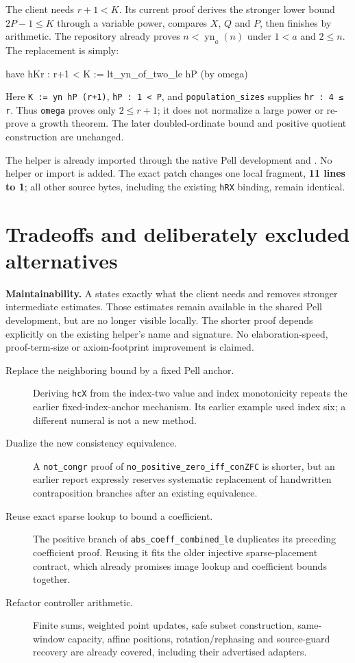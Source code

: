The client needs $r+1<K$. Its current proof derives the stronger lower bound $2P-1\le K$ through a variable power, compares $X$, $Q$ and $P$, then finishes by arithmetic. The repository already proves $n<\operatorname{yn}_{a}(n)$ under $1<a$ and $2\le n$. The replacement is simply:
\begin{Lean}
  have hKr : r+1 < K := lt_yn_of_two_le hP (by omega)
\end{Lean}
Here \texttt{K := yn hP (r+1)}, \texttt{hP : 1 < P}, and \texttt{population\_sizes} supplies \texttt{hr : 4 ≤ r}. Thus \texttt{omega} proves only $2\le r+1$; it does not normalize a large power or re-prove a growth theorem. The later doubled-ordinate bound and positive quotient construction are unchanged.

The helper is already imported through the native Pell development and . No helper or import is added. The exact patch changes one local fragment, \textbf{11 lines to 1}; all other source bytes, including the existing \texttt{hRX} binding, remain identical.

\newpage
\section{Tradeoffs and deliberately excluded alternatives}
\textbf{Maintainability.} A states exactly what the client needs and removes stronger intermediate estimates. Those estimates remain available in the shared Pell development, but are no longer visible locally. The shorter proof depends explicitly on the existing helper's name and signature. No elaboration-speed, proof-term-size or axiom-footprint improvement is claimed.

\begin{description}
\item[Replace the neighboring bound by a fixed Pell anchor.] Deriving \texttt{hcX} from the index-two value and index monotonicity repeats the earlier fixed-index-anchor mechanism. Its earlier example used index six; a different numeral is not a new method.
\item[Dualize the new consistency equivalence.] A \texttt{not\_congr} proof of \texttt{no\_positive\_zero\_iff\_conZFC} is shorter, but an earlier report expressly reserves systematic replacement of handwritten contraposition branches after an existing equivalence.
\item[Reuse exact sparse lookup to bound a coefficient.] The positive branch of \texttt{abs\_coeff\_combined\_le} duplicates its preceding coefficient proof. Reusing it fits the older injective sparse-placement contract, which already promises image lookup and coefficient bounds together.
\item[Refactor controller arithmetic.] Finite sums, weighted point updates, safe subset construction, same-window capacity, affine positions, rotation/rephasing and source-guard recovery are already covered, including their advertised adapters.
\end{description}

